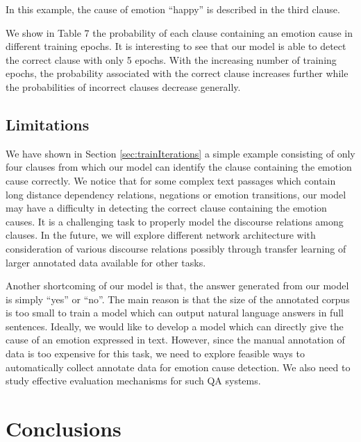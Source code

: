 \documentclass[11pt,letterpaper]{article}
\begin{document}
\begin{CJK*}{UTF8}{gbsn}
In this example, the cause of emotion ``happy'' is described in the third clause. 

We show in Table 7 the probability of each clause containing an emotion cause in different training epochs. It is interesting to see that our model is able to detect the correct clause with only 5 epochs. With the increasing number of training epochs, the probability associated with the correct clause increases further while the probabilities of incorrect clauses decrease generally.



\subsection{Limitations}
\label{sec:limitations}

We have shown in Section \ref{sec:trainIterations} a simple example consisting of only four clauses from which our model can identify the clause containing the emotion cause correctly. We notice that for some complex text passages which contain long distance dependency relations, negations or emotion transitions, our model may have a difficulty in detecting the correct clause containing the emotion causes. It is a challenging task to properly model the discourse relations among clauses. In the future, we will explore different network architecture with consideration of various discourse relations possibly through transfer learning of larger annotated data available for other tasks. 

Another shortcoming of our model is that, the answer generated from our model is simply ``yes'' or ``no''. The main reason is that the size of the annotated corpus is too small to train a model which can output natural language answers in full sentences. Ideally, we would like to develop a model which can directly give the cause of an emotion expressed in text. However, since the manual annotation of data is too expensive for this task, we need to explore feasible ways to automatically collect annotate data for emotion cause detection. We also need to study effective evaluation mechanisms for such QA systems.


\section{Conclusions}
\label{sec:section5}


\end{CJK*}
\end{document}
